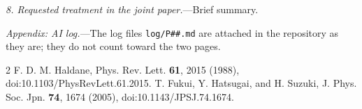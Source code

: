 \documentclass[reprint,aps,prl,superscriptaddress,amsmath,amssymb,floatfix]{revtex4-2}
\begin{document}
\textit{8. Requested treatment in the joint paper.}---Brief summary.

\textit{Appendix: AI log.}---The log files \texttt{log/P\#\#.md} are attached in the repository as
they are; they do not count toward the two pages.

\begin{thebibliography}{2}
   F. D. M. Haldane, Phys. Rev. Lett. \textbf{61}, 2015 (1988),
  doi:10.1103/PhysRevLett.61.2015.
   T. Fukui, Y. Hatsugai, and H. Suzuki, J. Phys. Soc. Jpn. \textbf{74}, 1674 (2005),
  doi:10.1143/JPSJ.74.1674.
\end{thebibliography}
\end{document}
